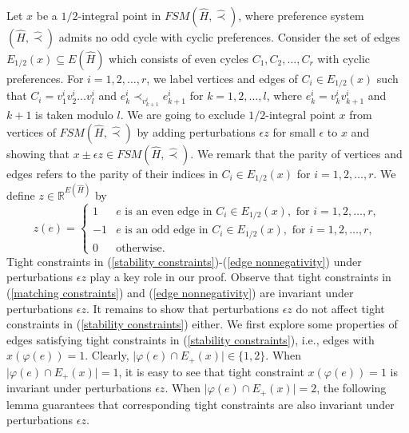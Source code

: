 \documentclass[11pt]{article}
\numberwithin{theorem}{section}
\begin{document}
Let $x$ be a $1/2$-integral point in $FSM(\hat{H},\hat\prec)$, where preference system $(\hat{H},\hat\prec)$ admits no odd cycle with cyclic preferences.
Consider the set of edges $E_{1/2}(x)\subseteq E(\hat{H})$ which consists of even cycles $C_1,C_2,\ldots,C_r$ with cyclic preferences. For $i=1,2,\ldots,r$, we label vertices and edges of $C_i\in E_{1/2}(x)$ such that $C_i=v^i_1v^i_2\ldots v^i_{l}$ and $e^i_k\prec_{v^i_{k+1}} e^i_{k+1}$ for $k=1,2,\ldots,l$, where $e^i_k=v^i_{k}v^i_{k+1}$ and $k+1$ is taken modulo $l$. We are going to exclude $1/2$-integral point $x$ from vertices of $FSM(\hat{H},\hat\prec)$ by adding perturbations $\epsilon z$ for small $\epsilon$ to $x$ and showing that $x\pm\epsilon z\in FSM(\hat{H},\hat\prec)$. We remark that the parity of vertices and edges refers to the parity of their indices in $C_i\in E_{1/2}(x)$ for $i=1,2,\ldots,r$. We define $z\in \mathbb{R}^{E(\hat{H})}$ by
\begin{equation*}
z(e)=
\begin{cases}
1 & e\text{ is an even edge in }C_i \in E_{1/2}(x),\text{ for }i=1,2,\ldots,r,\\
-1 & e\text{ is an odd edge in }C_i\in E_{1/2}(x),\text{ for }i=1,2,\ldots,r,\\
0 & \text{otherwise}.
\end{cases}
\end{equation*}
Tight constraints in (\ref{stability constraints})-(\ref{edge nonnegativity}) under perturbations $\epsilon z$ play a key role in our proof. Observe that tight constraints in (\ref{matching constraints}) and (\ref{edge nonnegativity}) are invariant under perturbations $\epsilon z$. It remains to show that perturbations $\epsilon z$ do not affect tight constraints in (\ref{stability constraints}) either. We first explore some properties of edges satisfying tight constraints in (\ref{stability constraints}), i.e., edges with $x(\varphi(e))=1$. Clearly, $\lvert \varphi(e)\cap E_+(x)\rvert \in\{1,2\}$. When $\lvert \varphi(e)\cap E_+(x)\rvert=1$, it is easy to see that tight constraint $x(\varphi(e))=1$ is invariant under perturbations $\epsilon z$. When $\lvert \varphi(e)\cap E_+(x)\rvert =2$, the following lemma guarantees that corresponding tight constraints are also invariant under perturbations $\epsilon z$.
  
\end{document}
